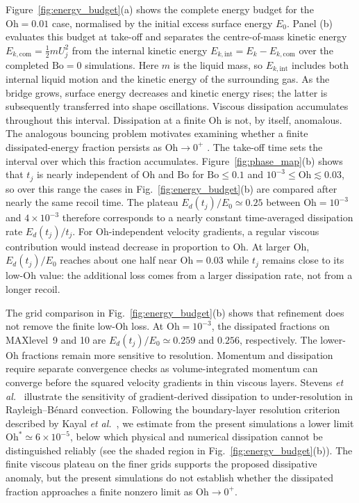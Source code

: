 \documentclass[
reprint,
amsmath,amssymb,
superscriptaddress,
onecolumn,
aps,
prfluids,
longbibliography,
floatfix
]{revtex4-2}
\newcommand{\Oh}{\mathrm{Oh}}
\newcommand{\Bo}{\mathrm{Bo}}
\begin{document}
Figure~\ref{fig:energy_budget}(a) shows the complete energy budget for the $\Oh=0.01$ case, normalised by the initial excess surface energy $E_0$. Panel (b) evaluates this budget at take-off and separates the centre-of-mass kinetic energy $E_{k,\mathrm{com}}=\tfrac{1}{2}mU_j^2$ from the internal kinetic energy $E_{k,\mathrm{int}}=E_k-E_{k,\mathrm{com}}$ over the completed $\Bo=0$ simulations. Here $m$ is the liquid mass, so $E_{k,\mathrm{int}}$ includes both internal liquid motion and the kinetic energy of the surrounding gas.
As the bridge grows, surface energy decreases and kinetic energy rises; the latter is subsequently transferred into shape oscillations. Viscous dissipation accumulates throughout this interval. Dissipation at a finite $\Oh$ is not, by itself, anomalous. The analogous bouncing problem motivates examining whether a finite dissipated-energy fraction persists as $\Oh\to0^+$ \cite{sanjay2023bouncing,sanjay2025unifying}.
The take-off time sets the interval over which this fraction accumulates. Figure~\ref{fig:phase_map}(b) shows that $t_j$ is nearly independent of $\Oh$ and $\Bo$ for $\Bo\le0.1$ and $10^{-3}\le\Oh\lesssim0.03$, so over this range the cases in Fig.~\ref{fig:energy_budget}(b) are compared after nearly the same recoil time. The plateau $E_d(t_j)/E_0\simeq0.25$ between $\Oh=10^{-3}$ and $4\times10^{-3}$ therefore corresponds to a nearly constant time-averaged dissipation rate $E_d(t_j)/t_j$. For $\Oh$-independent velocity gradients, a regular viscous contribution would instead decrease in proportion to $\Oh$. At larger $\Oh$, $E_d(t_j)/E_0$ reaches about one half near $\Oh=0.03$ while $t_j$ remains close to its low-$\Oh$ value: the additional loss comes from a larger dissipation rate, not from a longer recoil.

The grid comparison in Fig.~\ref{fig:energy_budget}(b) shows that refinement does not remove the finite low-$\Oh$ loss. At $\Oh=10^{-3}$, the dissipated fractions on MAXlevel~9 and 10 are $E_d(t_j)/E_0\simeq0.259$ and $0.256$, respectively. The lower-$\Oh$ fractions remain more sensitive to resolution. Momentum and dissipation require separate convergence checks as volume-integrated momentum can converge before the squared velocity gradients in thin viscous layers. Stevens \textit{et al.}~\cite{stevens2010radial} illustrate the sensitivity of gradient-derived dissipation to under-resolution in Rayleigh--B\'enard convection. Following the boundary-layer resolution criterion described by Kayal \textit{et al.}~\cite{kayal2025focusing}, we estimate from the present simulations a lower limit $\Oh^*\simeq6\times10^{-5}$, below which physical and numerical dissipation cannot be distinguished reliably (see the shaded region in Fig.~\ref{fig:energy_budget}(b)). The finite viscous plateau on the finer grids supports the proposed dissipative anomaly, but the present simulations do not establish whether the dissipated fraction approaches a finite nonzero limit as $\Oh\to0^+$.
\end{document}
